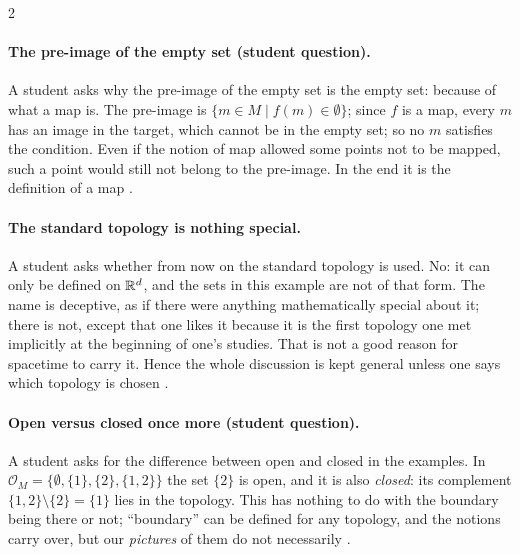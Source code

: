 \begin{paracol}{2}
\paragraph{The pre-image of the empty set (student question).} A student asks why the pre-image of the empty set is the empty set: because of what a map is.
The pre-image is $\{m\in M\mid f(m)\in\emptyset\}$; since $f$ is a map, every $m$ has an image in the target, which cannot be in the empty set; so no $m$
satisfies the condition. Even if the notion of map allowed some points not to be mapped, such a point would still not belong to the pre-image. In the end it is
the definition of a map .

\paragraph{The standard topology is nothing special.} A student asks whether from now on the standard topology is used. No: it can only be defined on
$\mathbb{R}^d$, and the sets in this example are not of that form. The name is deceptive, as if there were anything mathematically special about it; there is not,
except that one likes it because it is the first topology one met implicitly at the beginning of one's studies. That is not a good reason for spacetime to
carry it. Hence the whole discussion is kept general unless one says which topology is chosen .

\paragraph{Open versus closed once more (student question).} A student asks for the difference between open and closed in the examples. In $\mathcal O_M=\{\emptyset,\{1\},\{2\},\{1,2\}\}$
the set $\{2\}$ is open, and it is also \emph{closed}: its complement $\{1,2\}\setminus\{2\}=\{1\}$ lies in the topology. This has nothing to do with the
boundary being there or not; ``boundary'' can be defined for any topology, and the notions carry over, but our \emph{pictures} of them do not necessarily
.


\end{paracol}
